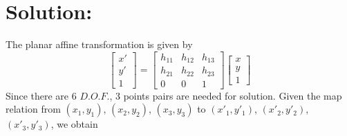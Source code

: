 \documentclass[12pt]{article}
\begin{document}
\section{Solution:}
The planar affine transformation is given by
\begin{equation*}
\left[ \begin{array}{c}
x'\\
y'\\
1
\end{array} \right] = \left[ \begin{array}{ccc}
h_{11} & h_{12} & h_{13} \\
h_{21} & h_{22} & h_{23} \\
0 & 0 & 1
\end{array} \right]\left[ \begin{array}{c}
x\\
y\\
1
\end{array} \right] 
\end{equation*}
Since there are 6 $D.O.F.$, 3 points pairs are needed for solution. Given the map relation from $(x_1, y_1)$, $(x_2, y_2)$, $(x_3, y_3)$ to $(x'_1, y'_1)$, $(x'_2, y'_2)$, $(x'_3, y'_3)$, we obtain
\end{document}
